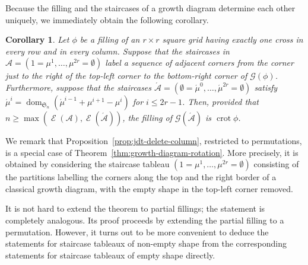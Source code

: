 \documentclass[10pt]{article}
\newtheorem{coro}[theorem]{Corollary}
\theoremstyle{definition}
\newcommand{\fS}{\mathfrak{S}}
\DeclareMathOperator{\dom}{dom} %
\DeclareMathOperator{\crot}{crot} %
\DeclareMathOperator{\extent}{\mathcal{E}} %
\newcommand{\wgt}{\mu}
\newcommand{\alt}{\mathcal{A}} %
\newcommand{\Grm}{\mathcal{G}} %
\newcommand{\half}[1]{\acute{#1}} %
\def\hm{\half{\wgt}}
\begin{document}
Because the filling and the staircases of a growth diagram determine
each other uniquely, we immediately obtain the following corollary.
\begin{coro}\label{cor:growth-diagram-rotation}
 Let $\phi$ be a filling of an $r\times r$ square grid having
 exactly one cross in every row and in every column. Suppose that
 the staircases in $\alt=(1=\wgt^1,\dots,\wgt^{2r}=\emptyset)$ label
 a sequence of adjacent corners from the corner just to the right of
 the top-left corner to the bottom-right corner of $\Grm(\phi)$.
 Furthermore, suppose that the staircases
 $\half\alt=(\emptyset=\hm^0,\dots,\hm^{2r}=\emptyset)$ satisfy
 $\hm^i = \dom_{\fS_n}(\hm^{i-1}+\wgt^{i+1}-\wgt^i)$ for
 $i\leq 2r-1$. Then, provided that
 $n\geq\max(\extent(\alt),\extent(\half\alt))$, the filling of
 $\Grm(\half\alt)$ is $\crot\phi$.
%
%
\end{coro}
We remark that
%
Proposition~\ref{prop:jdt-delete-column}, restricted to permutations,
is a special case of Theorem~\ref{thm:growth-diagram-rotation}. More
precisely, it is obtained by considering the staircase tableau
$(1=\wgt^1,\dots,\wgt^{2r}=\emptyset)$ consisting of the partitions
labelling the corners along the top and the right border of a
classical growth diagram, with the empty shape in the top-left corner
removed.

It is not hard to extend the theorem to partial fillings; the
statement is completely analogous. Its proof proceeds by extending
the partial filling to a permutation. However, it turns out to be
more convenient to deduce the statements for staircase tableaux of
non-empty shape from the corresponding statements for staircase
tableaux of empty shape directly.
\end{document}
